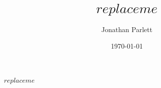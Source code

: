 \documentclass{beamer}
\title{$replaceme$}
\author{Jonathan Parlett}
\date{\today}
\begin{document}
\begin{frame}
    \titlepage
	{\bf $replaceme$}
\end{frame}
\end{document}
